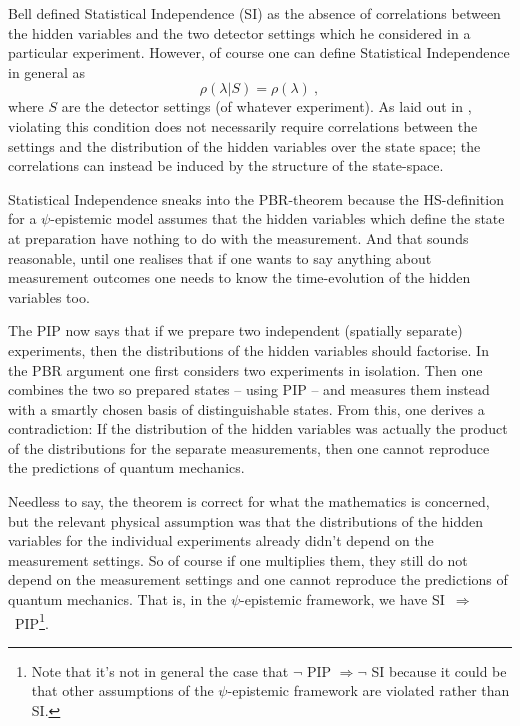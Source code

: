 \documentclass[superscriptaddress,twocolumn,floatfix,nofootinbib]{revtex4-2}
\begin{document}
Bell defined Statistical Independence ({\sc SI}) as the absence of correlations between the hidden variables and the two detector settings which he considered in a particular experiment. However, of course one can define Statistical Independence in general as 
\begin{equation}
    \rho(\lambda | S) = \rho(\lambda)~,
\end{equation}
where $S$ are the detector settings (of whatever experiment). As laid out in \cite{Hance2021StatInd}, violating this condition does not necessarily require correlations between the settings and the distribution of the hidden variables over the state space; the correlations can instead be induced by the structure of the state-space. 

Statistical Independence sneaks into the {\sc PBR}-theorem because the HS-definition for a $\psi$-epistemic model assumes that the hidden variables which define the state at preparation have nothing to do with the measurement. And that sounds reasonable, until one realises that if one wants to say anything about measurement outcomes one needs to know the time-evolution of the hidden variables too. 

The {\sc PIP} now says that if we prepare two independent (spatially separate) experiments, then the distributions of the hidden variables should factorise. In the {\sc PBR} argument one first considers two experiments in isolation. Then one combines the two so prepared states -- using {\sc PIP} -- and measures them instead with a smartly chosen basis of distinguishable states. From this, one derives a contradiction: If the distribution of the hidden variables was actually the product of the distributions for the separate measurements, then one cannot reproduce the predictions of quantum mechanics. 

Needless to say, the theorem is correct for what the mathematics is concerned, but the relevant physical assumption was that the distributions of the hidden variables for the individual experiments already didn't depend on the measurement settings. So of course if one multiplies them, they still do not depend on the measurement settings and one cannot reproduce the predictions of quantum mechanics. That is, in the $\psi$-epistemic framework, we have {\sc SI}~$\Rightarrow$~{\sc PIP}\footnote{Note that it's not in general the case that $\neg$ {\sc PIP} $\Rightarrow \neg$ SI because it could be that other assumptions of the $\psi$-epistemic framework are violated rather than SI.}.  
\end{document}
